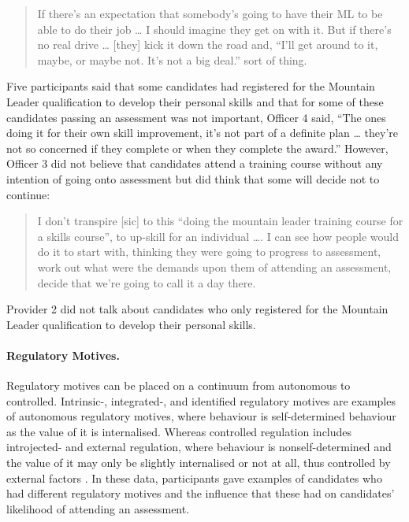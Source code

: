 \documentclass[
  12pt,
  a4paper,
]{book}
\begin{document}
\begin{quote}
If there's an expectation that somebody's going to have their ML to be able to do their job \ldots{} I should imagine they get on with it. But if there's no real drive \ldots{} {[}they{]} kick it down the road and, ``I'll get around to it, maybe, or maybe not. It's not a big deal.'' sort of thing.
\end{quote}

Five participants said that some candidates had registered for the Mountain Leader qualification to develop their personal skills and that for some of these candidates passing an assessment was not important, Officer 4 said, ``The ones doing it for their own skill improvement, it's not part of a definite plan \ldots{} they're not so concerned if they complete or when they complete the award.'' However, Officer 3 did not believe that candidates attend a training course without any intention of going onto assessment but did think that some will decide not to continue:

\begin{quote}
I don't transpire {[}sic{]} to this ``doing the mountain leader training course for a skills course'', to up-skill for an individual \ldots. I can see how people would do it to start with, thinking they were going to progress to assessment, work out what were the demands upon them of attending an assessment, decide that we're going to call it a day there.
\end{quote}

Provider 2 did not talk about candidates who only registered for the Mountain Leader qualification to develop their personal skills.

\hypertarget{regulatory-motives.}{%
\paragraph{Regulatory Motives.}\label{regulatory-motives.}}

Regulatory motives can be placed on a continuum from autonomous to controlled. Intrinsic-, integrated-, and identified regulatory motives are examples of autonomous regulatory motives, where behaviour is self-determined behaviour as the value of it is internalised. Whereas controlled regulation includes introjected- and external regulation, where behaviour is nonself-determined and the value of it may only be slightly internalised or not at all, thus controlled by external factors \citep{Deci2000}. In these data, participants gave examples of candidates who had different regulatory motives and the influence that these had on candidates' likelihood of attending an assessment.
\end{document}
